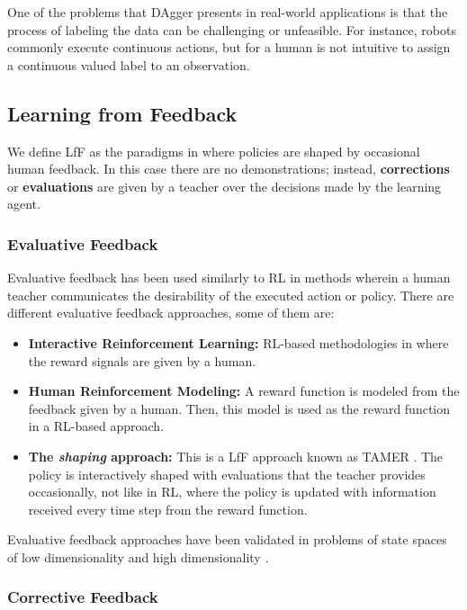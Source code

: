 One of the problems that DAgger presents in real-world applications is that the process of labeling the data can be challenging or unfeasible. For instance, robots commonly execute continuous actions, but for a human is not intuitive to assign a continuous valued label to an observation.

\subsection{Learning from Feedback}

We define LfF as the paradigms in where policies are shaped by occasional human feedback. In this case there are no demonstrations; instead, \textbf{corrections} or \textbf{evaluations} are given by a teacher over the decisions made by the learning agent.

\subsubsection{Evaluative Feedback}

Evaluative feedback has been used similarly to RL in methods wherein a human teacher communicates the desirability of the executed action or policy. There are different evaluative feedback approaches, some of them are:

\begin{itemize}
    \item \textbf{Interactive Reinforcement Learning:} RL-based methodologies in where the reward signals are given by a human.
    \item \textbf{Human Reinforcement Modeling:} A reward function is modeled from the feedback given by a human. Then, this model is used as the reward function in a RL-based approach.
    \item \textbf{The \emph{shaping} approach:} This is a LfF approach known as TAMER \cite{Knox:2009:ISA:1597735.1597738}. The policy is interactively shaped with evaluations that the teacher provides occasionally, not like in RL, where the policy is updated with information received every time step from the reward function.
\end{itemize}


Evaluative feedback approaches have been validated in problems of state spaces of low dimensionality \cite{Knox:2009:ISA:1597735.1597738,akrour2011preference,macglashan2017interactive} and high dimensionality \cite{Christiano2017,Warnell2017}.

\subsubsection{Corrective Feedback}

